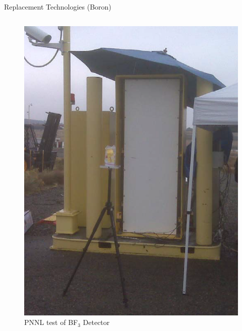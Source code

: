 \begin{frame}{Replacement Technologies (Boron)}
\begin{columns}[onlytextwidth]
\begin{column}{0.45\textwidth}
\begin{figure}
		\includegraphics[height=0.25\textheight]{images/BF3Test.eps}
		\caption{PNNL test of BF${}_3$ Detector}
		\label{fig:BF3PNNLTest}
	\end{figure}
\end{column}
\end{columns}
\end{frame}

